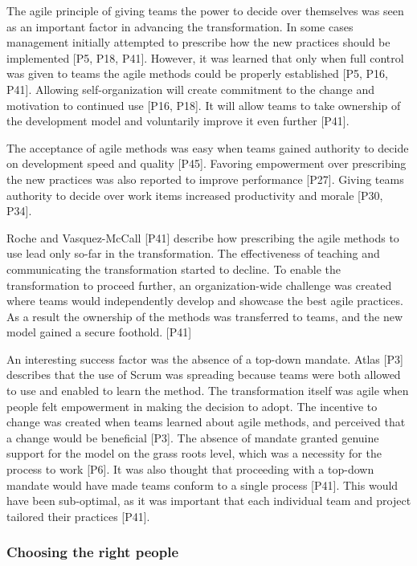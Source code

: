 
The agile principle of giving teams the power to decide over themselves was seen
as an important factor in advancing the transformation.
In some cases management initially attempted to prescribe how the new practices
should be implemented [P5, P18, P41]. However, it was learned that only when
full control was given to teams the agile methods could be properly established
[P5, P16, P41].
Allowing self-organization will create commitment to the change and motivation
to continued use [P16, P18]. It will allow teams to take ownership of the
development model and voluntarily improve it even further [P41].

The acceptance of agile methods was easy when teams gained authority to decide
on development speed and quality [P45]. Favoring empowerment over prescribing
the new practices was also reported to improve performance [P27]. Giving teams
authority to decide over work items increased productivity and morale [P30,
P34].

Roche and Vasquez-McCall [P41] describe how prescribing the agile methods to use
lead only so-far in the transformation. The effectiveness of teaching and
communicating the transformation started to decline. To enable the
transformation to proceed further, an organization-wide challenge was created
where teams would independently develop and showcase the best agile practices.
As a result the ownership of the methods was transferred to teams, and the new
model gained a secure foothold. [P41]


An interesting success factor was the absence of a top-down mandate. Atlas [P3]
describes that the use of Scrum was spreading because teams were both allowed to
use and enabled to learn the method. The transformation itself was agile when
people felt empowerment in making the decision to adopt. The incentive to change
was created when teams learned about agile methods, and perceived that a change
would be beneficial [P3].
The absence of mandate granted genuine support for the model on the grass roots
level, which was a necessity for the process to work [P6].
It was also thought that proceeding with a top-down mandate would have made
teams conform to a single process [P41]. This would have been sub-optimal, as it
was important that each individual team and project tailored their practices
[P41].


\subsubsection{Choosing the right people}

